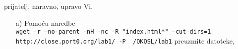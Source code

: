 \documentclass{exam}
\newcommand{\shell}[1]{\texttt{#1}}
\begin{document}
                                                                                            prijatelj,
                                                                                            naravno,
                                                                                            upravo
                                                                                            Vi.
                                                                                            \begin{itemize}
                                                                                                        \item[a)]
                                                                                                            Pomoću
                                                                                                            naredbe
                                                                                                            \\
                                                                                                                 \shell{wget
                                                                                                                 -r
                                                                                                                 --no-parent
                                                                                                                 -nH
                                                                                                                 -nc
                                                                                                                 -R
                                                                                                                 "index.html*"
                                                                                                                 --cut-dirs=1
                                                                                                                 http://close.port0.org/lab1/
                                                                                                                 -P
                                                                                                                 ~/OKOSL/lab1}
                                                                                                                 preuzmite
                                                                                                                 datoteke,

\end{itemize}
\end{document}
